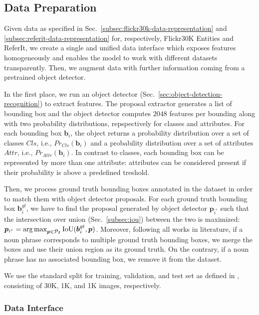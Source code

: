 \subsection{Data Preparation}
\label{subsec:data-preparation}

Given data as specified in
Sec.~\ref{subsec:flickr30k-data-representation} and
\ref{subsec:referit-data-representation} for, respectively, Flickr30K
Entities and ReferIt, we create a single and unified data interface
which exposes features homogeneously and enables the model to work
with different datasets transparently. Then, we augment data with
further information coming from a pretrained object detector.

In the first place, we run an object detector
(Sec.~\ref{sec:object-detection-recognition}) to extract features. The
proposal extractor generates a list of bounding box and the object
detector computes $2048$ features per bounding along with two
probability distributions, repspectively for classes and attributes.
For each bounding box $\bm{b}_i$, the object returns a probability
distribution over a set of classes $Cls$, i.e., $Pr_{Cls}(\bm{b}_i)$
and a probability distribution over a set of attributes $Attr$, i.e.,
$Pr_{Attr}(\bm{b}_i)$. In contrast to classes, each bounding box can
be represented by more than one attribute: attributes can be
considered present if their probability is above a predefined
treshold.

Then, we process ground truth bounding boxes annotated in the dataset
in order to match them with object detector proposals. For each ground
truth bounding box $\bm{b}^{gt}_i$, we have to find the proposal
generated by object detector $\bm{p}_{i^*}$ such that the intersection
over union (Sec.~\ref{subsec:iou}) between the two is maximized:
$\bm{p}_{i^*} = \operatorname*{arg\,max}_{\bm{p} \in \mathcal{P}_{\bm{I}}}
\text{IoU}(\bm{b}^{gt}_i, \bm{p})$. Moreover, following all works in
literature, if a noun phrase corresponds to multiple ground truth
bounding boxes, we merge the boxes and use their union region as its
ground truth. On the contrary, if a noun phrase has no associated
bounding box, we remove it from the dataset.

We use the standard split for training, validation, and test set as
defined in  \cite{plummer2015flickr30k}, consisting of 30K, 1K,
and 1K images, respectively. 

\subsubsection{Data Interface}
\label{subsec:data-interface}

